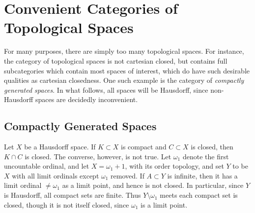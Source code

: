 \documentclass{book}
\theoremstyle{definition}
\newtheorem{proposition}{Proposition}[section]
\theoremstyle{remark}
\begin{document}



\chapter{Convenient Categories of Topological Spaces}
For many purposes, there are simply too many topological spaces. For instance, the category of topological spaces is not cartesian closed, but contains full subcategories which contain most spaces of interest, which do have such desirable qualities as cartesian closedness. One such example is the category of \textit{compactly generated spaces}. In what follows, all spaces will be Hausdorff, since non-Hausdorff spaces are decidedly inconvenient.

\section{Compactly Generated Spaces}
Let $X$ be a Hausdorff space. If $K\subset X$ is compact and $C\subset X$ is closed, then $K\cap C$ is closed. The converse, however, is not true. Let $\omega_1$ denote the first uncountable ordinal, and let $X=\omega_1+1$, with its order topology, and set $Y$ to be $X$ with all limit ordinals except $\omega_1$ removed. If $A\subset Y$ is infinite, then it has a limit ordinal $\neq\omega_1$ as a limit point, and hence is not closed. In particular, since $Y$ is Hausdorff, all compact sets are finite. Thus $Y\setminus\omega_1$ meets each compact set is closed, though it is not itself closed, since $\omega_1$ is a limit point.
\end{document}
